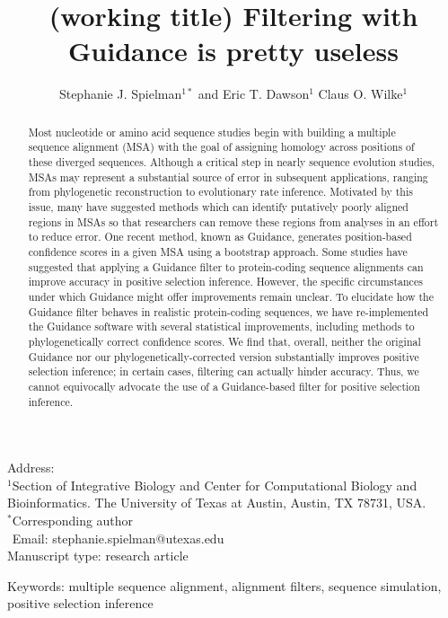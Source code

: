 \documentclass[12pt]{article}
\begin{document}
\title{\textbf{(working title) Filtering with Guidance is pretty useless}}
\author{Stephanie J. Spielman$^{1*}$ and Eric T. Dawson$^{1}$ Claus O. Wilke$^{1}$}
\date{}

\maketitle
\noindent
Address:\\
$^1$Section of Integrative Biology and Center for Computational Biology and Bioinformatics. The University
of Texas at Austin, Austin, TX 78731, USA.\\

\bigskip
\noindent
$^*$Corresponding author\\
$\phantom{^*}$Email: stephanie.spielman@utexas.edu\\

\bigskip
\noindent
Manuscript type: research article

\bigskip
\noindent Keywords: multiple sequence alignment, alignment filters, sequence simulation, positive selection inference

\newpage
\begin{abstract}
	Most nucleotide or amino acid sequence studies begin with building a multiple sequence alignment (MSA) with the goal of assigning homology across positions of these diverged sequences. Although a critical step in nearly sequence evolution studies, MSAs may represent a substantial source of error in subsequent applications, ranging from phylogenetic reconstruction to evolutionary rate inference. Motivated by this issue, many have suggested methods which can identify putatively poorly aligned regions in MSAs so that researchers can remove these regions from analyses in an effort to reduce error. One recent method, known as Guidance, generates position-based confidence scores in a given MSA using a bootstrap approach. Some studies have suggested that applying a Guidance filter to protein-coding sequence alignments can improve accuracy in positive selection inference. However, the specific circumstances under which Guidance might offer improvements remain unclear. To elucidate how the Guidance filter behaves in realistic protein-coding sequences, we have re-implemented the Guidance software with several statistical improvements, including methods to phylogenetically correct confidence scores. We find that, overall, neither the original Guidance nor our phylogenetically-corrected version substantially improves positive selection inference; in certain cases, filtering can actually hinder accuracy. Thus, we cannot equivocally advocate the use of a Guidance-based filter for positive selection inference.
\end{abstract}
\end{document}
